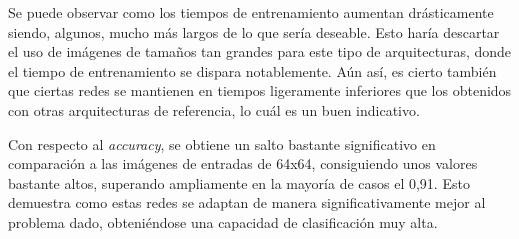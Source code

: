 Se puede observar como los tiempos de entrenamiento aumentan drásticamente siendo, algunos, mucho más largos de lo que sería deseable. Esto haría descartar el uso de imágenes de tamaños tan grandes para este tipo de arquitecturas, donde el tiempo de entrenamiento se dispara notablemente. Aún así, es cierto también que ciertas redes se mantienen en tiempos ligeramente inferiores que los obtenidos con otras arquitecturas de referencia, lo cuál es un buen indicativo. 

Con respecto al \textit{accuracy}, se obtiene un salto bastante significativo en comparación a las imágenes de entradas de 64x64, consiguiendo unos valores bastante altos, superando ampliamente en la mayoría de casos el 0,91. Esto demuestra como estas redes se adaptan de manera significativamente mejor al problema dado, obteniéndose una capacidad de clasificación muy alta.
